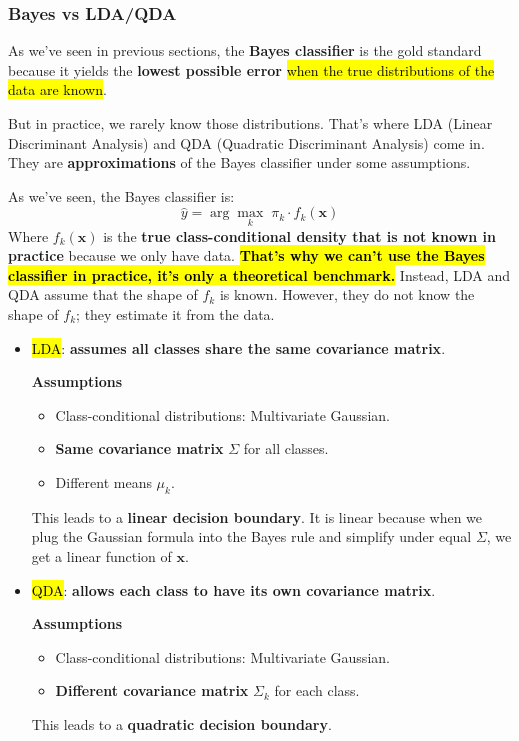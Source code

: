 \subsubsection{Bayes vs LDA/QDA}

As we've seen in previous sections, the \textbf{Bayes classifier} is the gold standard because it yields the \textbf{lowest possible error} \hl{when the true distributions of the data are known}.

\highspace
But in practice, we rarely know those distributions. That's where LDA (Linear Discriminant Analysis) and QDA (Quadratic Discriminant Analysis) come in. They are \textbf{approximations} of the Bayes classifier under some assumptions.

\highspace
As we've seen, the Bayes classifier is:
\begin{equation*}
    \hat{y} = \arg\max_k \; \pi_k \cdot f_k\left(\mathbf{x}\right)
\end{equation*}
Where $f_{k}\left(\mathbf{x}\right)$ is the \textbf{true class-conditional density that is not known in practice} because we only have data. \hl{\textbf{That's why we can't use the Bayes classifier in practice, it's only a theoretical benchmark.}} Instead, LDA and QDA assume that the shape of $f_{k}$ is known. However, they do not know the shape of $f_{k}$; they estimate it from the data.
\begin{itemize}
    \item \hl{LDA}: \textbf{assumes all classes share the same covariance matrix}.

    \textcolor{Green3}{ \textbf{Assumptions}}
    \begin{itemize}
        \item Class-conditional distributions: Multivariate Gaussian.
        \item \textbf{Same covariance matrix} $\Sigma$ for all classes.
        \item Different means $\mu_{k}$.
    \end{itemize}
    This leads to a \textbf{linear decision boundary}. It is linear because when we plug the Gaussian formula into the Bayes rule and simplify under equal $\Sigma$, we get a linear function of $\mathbf{x}$.
    
    \item \hl{QDA}: \textbf{allows each class to have its own covariance matrix}.

    \textcolor{Green3}{ \textbf{Assumptions}}
    \begin{itemize}
        \item Class-conditional distributions: Multivariate Gaussian.
        \item \textbf{Different covariance matrix} $\Sigma_k$ for each class.
    \end{itemize}
    This leads to a \textbf{quadratic decision boundary}.
\end{itemize}

